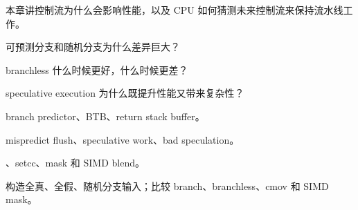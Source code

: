 {本章讲控制流为什么会影响性能，以及 CPU 如何猜测未来控制流来保持流水线工作。}
{\item 可预测分支和随机分支为什么差异巨大？
\item branchless 什么时候更好，什么时候更差？
\item speculative execution 为什么既提升性能又带来复杂性？}
{\item branch predictor、BTB、return stack buffer。
\item mispredict flush、speculative work、bad speculation。
\item {}、setcc、mask 和 SIMD blend。}
{构造全真、全假、随机分支输入；比较 branch、branchless、cmov 和 SIMD mask。}
